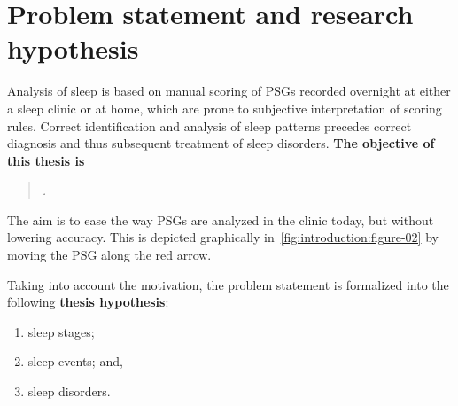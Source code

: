 \section{Problem statement and research hypothesis}
Analysis of sleep is based on manual scoring of \acp{PSG} recorded overnight at either a sleep clinic or at home, which are prone to subjective interpretation of scoring rules.
Correct identification and analysis of sleep patterns precedes correct diagnosis and thus subsequent treatment of sleep disorders.
\textbf{The objective of this thesis is}
\begin{quote}
    \emph{\objective.}
\end{quote}
The aim is to ease the way \acp{PSG} are analyzed in the clinic today, but without lowering accuracy.
This is depicted graphically in~\cref{fig:introduction:figure-02} by moving the \ac{PSG} along the red arrow.

Taking into account the motivation, the problem statement is formalized into the following \textbf{thesis hypothesis}:
\begin{quote}
    \hypothesis
\end{quote}
\begin{enumerate}[label={\footnotesize\bfseries\scshape RH~\arabic*}, ref={\bfseries\scshape RH~\arabic*}]
    \item sleep stages;\label{hypothesis:sleep-stages}%
    \item sleep events;\label{hypothesis:sleep-events} and,%
    \item sleep disorders.\label{hypothesis:sleep-disorders}%
\end{enumerate}


